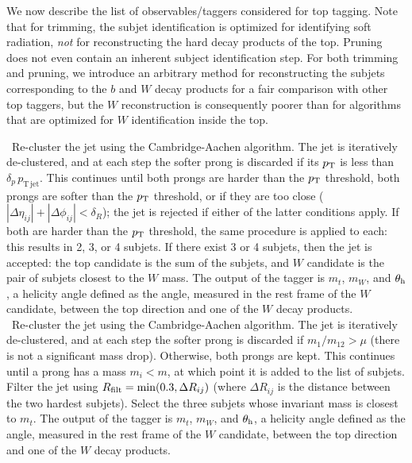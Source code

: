 We now describe the list of observables/taggers considered for top tagging. Note that for trimming, the subjet identification is optimized for identifying soft radiation, \emph{not} for reconstructing the hard decay products of the top. Pruning does not even contain an inherent subject identification step. For both trimming and pruning, we introduce an arbitrary method for reconstructing the subjets corresponding to the $b$ and $W$ decay products for a fair comparison with other top taggers, but the $W$ reconstruction is consequently poorer than for algorithms that are optimized for $W$ identification inside the top.

~Re-cluster the jet using the Cambridge-Aachen algorithm. The jet is iteratively de-clustered, and at each step the softer prong is discarded if its $p_{\rm T}$ is less than $\delta_p\,p_{\mathrm{T\,jet}}$. This continues until both prongs are harder than the $p_{\rm T}$ threshold, both prongs are softer than the $p_{\rm T}$ threshold, or if they are too close ($|\Delta\eta_{ij}|+|\Delta\phi_{ij}|<\delta_R$); the jet is rejected if either of the latter conditions apply. If both are harder than the $p_{\rm T}$ threshold, the same procedure is applied to each: this results in 2, 3, or 4 subjets. If there exist 3 or 4 subjets, then the jet is accepted: the top candidate is the sum of the subjets, and $W$ candidate is the pair of subjets closest to the $W$ mass. The output of the tagger is $m_t$, $m_W$, and $\theta_{\rm h}$, a helicity angle defined as the angle, measured in the rest frame of the $W$ candidate, between the top direction and one of the $W$ decay products.\\

~Re-cluster the jet using the Cambridge-Aachen algorithm. The jet is iteratively de-clustered, and at each step the softer prong is discarded if $m_1/m_{12}>\mu$ (there is not a significant mass drop). Otherwise, both prongs are kept. This continues until a prong has a mass $m_i < m$, at which point it is added to the list of subjets. Filter the jet using $R_{\rm filt}=\mathrm{min}(0.3,\Delta R_{ij})$ (where $\Delta R_{ij}$ is the distance between the two hardest subjets). Select the three subjets whose invariant mass is closest to $m_t$. The output of the tagger is $m_t$, $m_W$, and $\theta_{\rm h}$, a helicity angle defined as the angle, measured in the rest frame of the $W$ candidate, between the top direction and one of the $W$ decay products.\\

